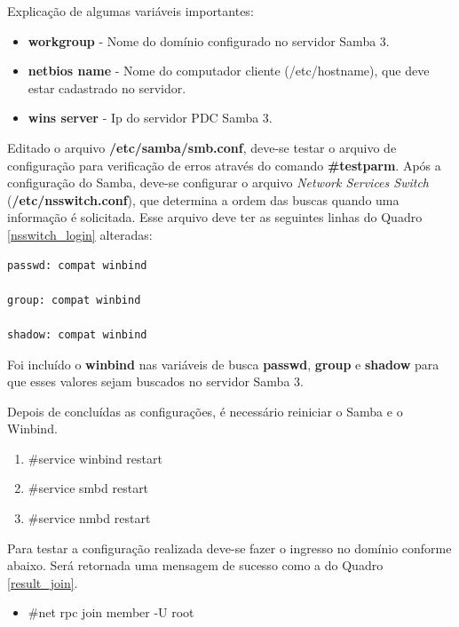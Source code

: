 Explicação de algumas variáveis importantes:
\begin{itemize}
	\item \textbf{workgroup} - Nome do domínio configurado no servidor Samba 3.
	\item \textbf{netbios name} - Nome do computador cliente (/etc/hostname), que deve estar cadastrado no servidor.
	\item \textbf{wins server} - Ip do servidor PDC Samba 3.
\end{itemize}

Editado o arquivo \textbf{/etc/samba/smb.conf}, deve-se testar o arquivo de configuração para verificação de erros através do comando \textbf{\#testparm}.
Após a configuração do Samba, deve-se configurar o arquivo \textit{Network Services Switch} (\textbf{/etc/nsswitch.conf}), que determina a ordem das buscas quando uma informação é solicitada. Esse arquivo deve ter as seguintes linhas do Quadro \ref{nsswitch_login} alteradas:\\

\begin{lstlisting}[caption=Arquivo nsswitch.conf,label={nsswitch_login}]	
passwd: compat winbind

group: compat winbind

shadow: compat winbind	
\end{lstlisting}

Foi incluído o \textbf{winbind} nas variáveis de busca \textbf{passwd}, \textbf{group} e \textbf{shadow} para que esses valores sejam buscados no servidor Samba 3.

Depois de concluídas as configurações, é necessário reiniciar o Samba e o Winbind.

\begin{enumerate}
	\item \#service winbind restart
	\item \#service smbd restart
	\item \#service nmbd restart	
\end{enumerate}


Para testar a configuração realizada deve-se fazer o ingresso no domínio conforme abaixo. Será retornada uma mensagem de sucesso como a do Quadro \ref{result_join}.\\

\begin{itemize}
	\item \#net rpc join member -U root
\end{itemize}

